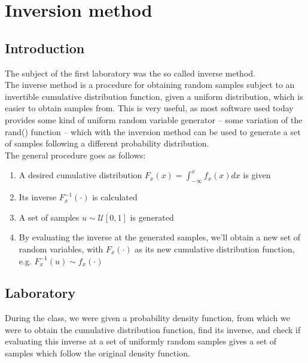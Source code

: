 
\chapter{Inversion method}
\section{Introduction}
The subject of the first laboratory was the so called inverse method.\\
The inverse method is a procedure for obtaining random samples subject to
an invertible cumulative distribution function, given a uniform 
distribution, which is easier to obtain samples from. This is very useful, as most
software used today provides some kind of uniform random variable generator -- some
variation of the rand() function -- which with the inversion method can be
used to generate a set of samples following a different probability distribution.\\
The general procedure goes as follows:
\begin{enumerate}
    \item A desired cumulative distribution $F_x(x) = \int_{-\infty}^{x}f_x(x)dx$ is given
    \item Its inverse $F_x^{-1}(\cdot)$ is calculated
    \item A set of samples $u \sim \mathcal{U}[0,1]$ is generated
    \item By evaluating the inverse at the generated samples, we'll obtain a new set of random variables,
        with $F_x(\cdot)$ as its new cumulative distribution function, e.g.  $F_x^{-1}(u) \sim f_x(\cdot)$
\end{enumerate}
\clearpage
\section{Laboratory}
During the class, we were given a probability density function, from which we were to obtain the cumulative
distribution function, find its inverse, and check if evaluating this inverse at a set of uniformly random samples
gives a set of samples which follow the original density function.
